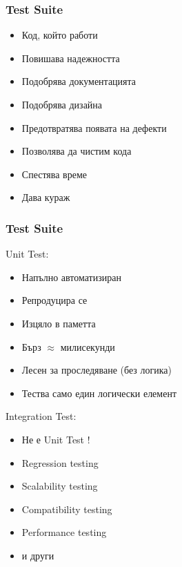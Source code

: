 \begin{frame}
  \frametitle{Test Suite}
  \begin{itemize}
    \item Код, който работи\pause
    \item Повишава надежността \pause
    \item Подобрява документацията\pause
    \item Подобрява дизайна\pause
    \item Предотвратява появата на дефекти\pause
    \item Позволява да чистим кода\pause
    \item Спестява време\pause
    \item Дава кураж
  \end{itemize}
\end{frame}

\begin{frame}
  \frametitle{Test Suite}
    \begin{minipage}[t]{0.48\linewidth}
        Unit Test:
        \begin{itemize}
          \item Напълно автоматизиран \pause
          \item Репродуцира се \pause
          \item Изцяло в паметта\pause
          \item Бърз $\approx$ милисекунди \pause
          \item Лесен за проследяване (без логика) \pause
          \item Тества само един логически елемент \pause
        \end{itemize}
    \end{minipage}\hfill
    \begin{minipage}[t]{0.48\linewidth}
        Integration Test:
        \begin{itemize}
          \item Не е Unit Test !\pause
          \item Regression testing\pause
          \item Scalability testing\pause
          \item Compatibility testing\pause
          \item Performance testing\pause
          \item и други
        \end{itemize}
    \end{minipage}
\end{frame}

